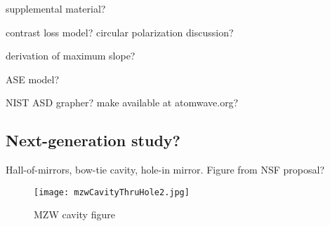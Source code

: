 supplemental material?

contrast loss model? circular polarization discussion?

derivation of maximum slope?

ASE model?

NIST ASD grapher? make available at atomwave.org?

\subsection{Next-generation study?}
Hall-of-mirrors, bow-tie cavity, hole-in mirror. Figure from NSF proposal?
\begin{figure}
\texttt{[image: mzwCavityThruHole2.jpg]}
\caption{\label{mzwCavityFig}MZW cavity figure}
\end{figure}

